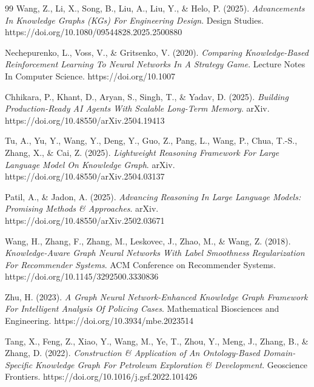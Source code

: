\begin{thebibliography}{99}
Wang, Z., Li, X., Song, B., Liu, A., Liu, Y., \& Helo, P. (2025). 
\textit{Advancements In Knowledge Graphs (KGs) For Engineering Design}. 
Design Studies. https://doi.org/10.1080/09544828.2025.2500880

Nechepurenko, L., Voss, V., \& Gritsenko, V. (2020). 
\textit{Comparing Knowledge-Based Reinforcement Learning To Neural Networks In A Strategy Game}. 
Lecture Notes In Computer Science. https://doi.org/10.1007

Chhikara, P., Khant, D., Aryan, S., Singh, T., \& Yadav, D. (2025). 
\textit{Building Production-Ready AI Agents With Scalable Long-Term Memory}. 
arXiv. https://doi.org/10.48550/arXiv.2504.19413

Tu, A., Yu, Y., Wang, Y., Deng, Y., Guo, Z., Pang, L., Wang, P., Chua, T.-S., Zhang, X., \& Cai, Z. (2025). 
\textit{Lightweight Reasoning Framework For Large Language Model On Knowledge Graph}. 
arXiv. https://doi.org/10.48550/arXiv.2504.03137

Patil, A., \& Jadon, A. (2025). 
\textit{Advancing Reasoning In Large Language Models: Promising Methods \& Approaches}. 
arXiv. https://doi.org/10.48550/arXiv.2502.03671

Wang, H., Zhang, F., Zhang, M., Leskovec, J., Zhao, M., \& Wang, Z. (2018). 
\textit{Knowledge-Aware Graph Neural Networks With Label Smoothness Regularization For Recommender Systems}. 
ACM Conference on Recommender Systems. https://doi.org/10.1145/3292500.3330836

Zhu, H. (2023). 
\textit{A Graph Neural Network-Enhanced Knowledge Graph Framework For Intelligent Analysis Of Policing Cases}. 
Mathematical Biosciences and Engineering. https://doi.org/10.3934/mbe.2023514

Tang, X., Feng, Z., Xiao, Y., Wang, M., Ye, T., Zhou, Y., Meng, J., Zhang, B., \& Zhang, D. (2022). 
\textit{Construction \& Application of An Ontology-Based Domain-Specific Knowledge Graph For Petroleum Exploration \& Development}. 
Geoscience Frontiers. https://doi.org/10.1016/j.gsf.2022.101426


\end{thebibliography}

